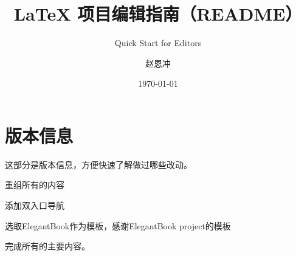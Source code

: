 \documentclass[lang=cn,11pt]{elegant}
\title{LaTeX 项目编辑指南（README）}
\subtitle{Quick Start for Editors}
\author{赵恩冲}
\date{\today}
\begin{document}
\maketitle






\section*{版本信息}
这部分是版本信息，方便快速了解做过哪些改动。

\begin{change}
  \item 重组所有的内容
  \item 添加双入口导航
\end{change}

\begin{change}
  \item 选取ElegantBook作为模板，感谢ElegantBook project的模板
  \item 完成所有的主要内容。
\end{change}
\end{document}
